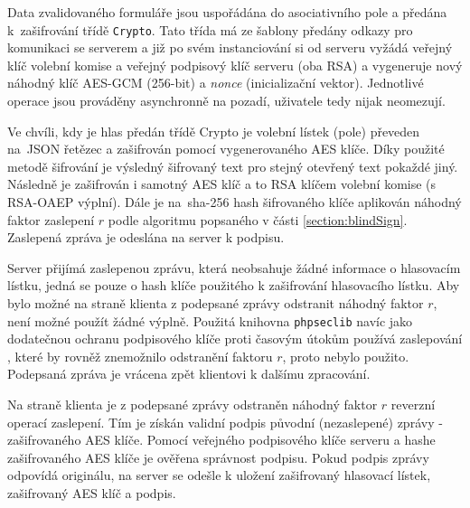 Data zvalidovaného formuláře jsou uspořádána do asociativního pole a předána k~zašifrování třídě \texttt{Crypto}. Tato třída má ze šablony předány odkazy pro komunikaci se serverem a již po svém instanciování si od serveru vyžádá veřejný klíč volební komise a veřejný podpisový klíč serveru (oba RSA) a vygeneruje nový náhodný klíč AES-GCM (256-bit) a \textit{nonce} (inicializační vektor). Jednotlivé operace jsou prováděny asynchronně na pozadí, uživatele tedy nijak neomezují.

Ve chvíli, kdy je hlas předán třídě Crypto je volební lístek (pole) převeden na~JSON řetězec a zašifrován pomocí vygenerovaného AES klíče. Díky použité metodě šifrování je výsledný šifrovaný text pro stejný otevřený text pokaždé jiný. Následně je zašifrován i samotný AES klíč a to RSA klíčem volební komise (s RSA-OAEP výplní). Dále je na~sha-256 hash šifrovaného klíče aplikován náhodný faktor zaslepení $r$ podle algoritmu popsaného v části \ref{section:blindSign}. Zaslepená zpráva je odeslána na server k podpisu.

Server přijímá zaslepenou zprávu, která neobsahuje žádné informace o hlasovacím lístku, jedná se pouze o hash klíče použitého k zašifrování hlasovacího lístku. Aby bylo možné na straně klienta z podepsané zprávy odstranit náhodný faktor $r$, není možné použít žádné výplně. Použitá knihovna \texttt{phpseclib} navíc jako dodatečnou ochranu podpisového klíče proti časovým útokům používá zaslepování \cite{phpseclibBlinding}, které by rovněž znemožnilo odstranění faktoru $r$, proto nebylo použito. Podepsaná zpráva je vrácena zpět klientovi k dalšímu zpracování.

Na straně klienta je z podepsané zprávy odstraněn náhodný faktor $r$ reverzní operací zaslepení. Tím je získán validní podpis původní (nezaslepené) zprávy - zašifrovaného AES klíče. Pomocí veřejného podpisového klíče serveru a hashe zašifrovaného AES klíče je ověřena správnost podpisu. Pokud podpis zprávy odpovídá originálu, na server se odešle k uložení zašifrovaný hlasovací lístek, zašifrovaný AES klíč a podpis.

